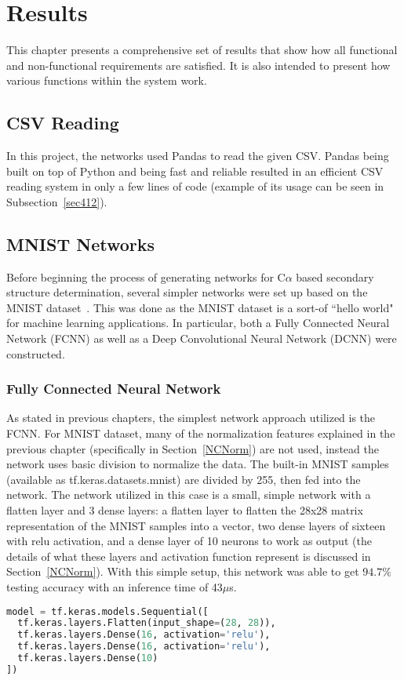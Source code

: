 \documentclass[12pt,letterpaper,oneside,reqno]{book}
\theoremstyle{plain}
\theoremstyle{definition}
\theoremstyle{plain}
\theoremstyle{remark}
\theoremstyle{plain}
\theoremstyle{definition}
\theoremstyle{plain}
\begin{document}
\chapter{Results}
This chapter presents a comprehensive set of results that show how  all functional and non-functional requirements are satisfied. It is also intended to present how various functions within the system work. 

\section{CSV Reading}
In this project, the networks used Pandas to read the given CSV. Pandas being built on top of Python and being fast and reliable resulted in an efficient CSV reading system in only a few lines of code (example of its usage can be seen in Subsection~\ref{sec412}). 

\section{MNIST Networks}
Before beginning the process of generating networks for C$\alpha$ based secondary structure determination, several simpler networks were set up based on the MNIST dataset~\cite{mnistds}. This was done as the MNIST dataset is a sort-of ``hello world" for machine learning applications. In particular, both a Fully Connected Neural Network (FCNN) as well as a Deep Convolutional Neural Network (DCNN) were constructed.
\subsection{Fully Connected Neural Network}
As stated in previous chapters, the simplest network approach utilized is the FCNN. For MNIST dataset, many of the normalization features explained in the previous chapter (specifically in Section~\ref{NCNorm}) are not used, instead the network uses 
 basic division to normalize the data. The built-in MNIST samples (available as tf.keras.datasets.mnist) are divided by 255, then fed into the network. The network utilized in this case is a small, simple network with a flatten layer and 3 dense layers: a flatten layer to flatten the 28x28 matrix representation of the MNIST samples into a vector, two dense layers of sixteen with relu activation, and a dense layer of 10 neurons to work as output (the details of what these layers and activation function represent is discussed in Section~\ref{NCNorm}). With this simple setup, this network was able to get $94.7\%$ testing accuracy with an inference time of 43$\mu$s.
\begin{lstlisting}[language=Python, caption={FCNN Model for MNIST Dataset}, label=lst:fcnn_mnist, frame=single]
model = tf.keras.models.Sequential([
  tf.keras.layers.Flatten(input_shape=(28, 28)),
  tf.keras.layers.Dense(16, activation='relu'),
  tf.keras.layers.Dense(16, activation='relu'),
  tf.keras.layers.Dense(10)
])
\end{lstlisting}
\end{document}
